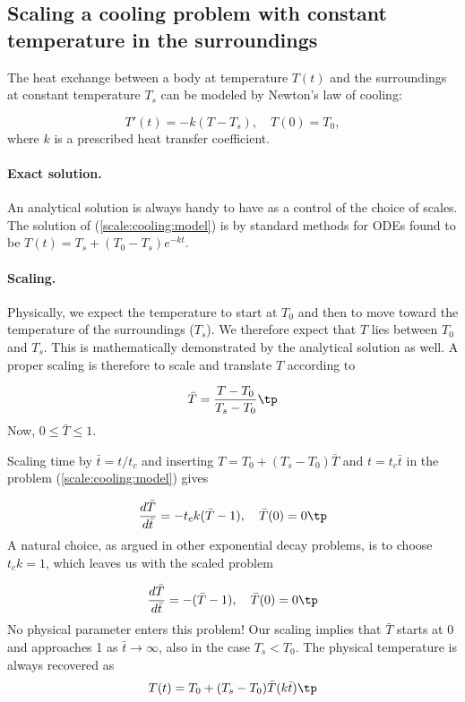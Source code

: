 \documentclass[graybox,envcountchap,sectrefs,final]{svmonodo}
\begin{document}
\subsection{Scaling a cooling problem with constant temperature in the surroundings}
\label{scale:cooling:const}

The heat exchange between a body at temperature $T(t)$ and the
surroundings at constant temperature $T_s$
can be modeled by Newton's law of cooling:

\begin{equation}
T'(t) = -k(T-T_s),\quad T(0)=T_0,
\label{scale:cooling:model}
\end{equation}
where $k$ is a prescribed heat transfer coefficient.

\paragraph{Exact solution.}
An analytical solution is always handy to have as a control of the
choice of scales. The solution of (\ref{scale:cooling:model})
is by standard methods for ODEs found to be
$T(t) = T_s + (T_0 - T_s)e^{-kt}$.

\paragraph{Scaling.}
Physically, we expect the temperature to start at $T_0$ and then to
move toward the temperature of the surroundings ($T_s$). We therefore
expect that $T$ lies between $T_0$ and $T_s$. This is mathematically
demonstrated by the analytical solution as well. A proper scaling is
therefore to scale and translate $T$ according to

\begin{equation}
\bar T = \frac{T-T_0}{T_s-T_0}
\label{scale:cooling:Tbar}
\tp
\end{equation}
Now, $0\leq \bar T\leq 1$.

Scaling time by $\bar t = t/t_c$ and inserting
$T= T_0 + (T_s-T_0)\bar T$ and $t=t_c\bar t$ in the
problem (\ref{scale:cooling:model}) gives

\[ \frac{d\bar T}{d\bar t} = - t_ck(\bar T - 1),\quad \bar T(0) = 0
\tp
\]
A natural choice, as argued in other exponential decay problems,
is to choose $t_ck=1$, which leaves us with the scaled problem

\begin{equation}
\frac{d\bar T}{d\bar t} = - (\bar T - 1),\quad \bar T(0)=0
\label{scale:cooling:Tbar:eq}
\tp
\end{equation}
No physical parameter enters this problem!
Our scaling implies that $\bar T$ starts at
0 and approaches 1 as $\bar t\rightarrow\infty$, also in the case
$T_s < T_0$. The physical temperature is always recovered as
\begin{equation}
T(t) = T_0 + (T_s-T_0)\bar T (k\bar t)
\label{scale:cooling:T}
\tp
\end{equation}
\end{document}
